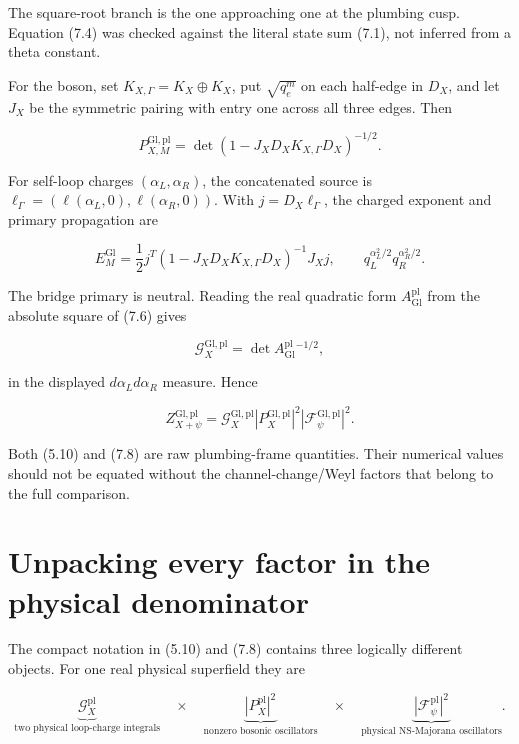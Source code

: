 \documentclass[11pt]{article}
\begin{document}
The square-root branch is the one approaching one at the plumbing cusp.
Equation (7.4) was checked against the literal state sum (7.1), not inferred
from a theta constant.

For the boson, set \(K_{X,\Gamma}=K_X\oplus K_X\), put
\(\sqrt{q_e^m}\) on each half-edge in \(D_X\), and let \(J_X\) be the
symmetric pairing with entry one across all three edges.  Then

\[
 P_{X,M}^{\mathrm{Gl},\mathrm{pl}}
 =\det\!\left(1-J_XD_XK_{X,\Gamma}D_X\right)^{-1/2}.
\tag{7.5}
\]

For self-loop charges \((\alpha_L,\alpha_R)\), the concatenated source is
\(\ell_\Gamma=(\ell(\alpha_L,0),\ell(\alpha_R,0))\).  With
\(j=D_X\ell_\Gamma\), the charged exponent and primary propagation are

\[
 E_M^{\mathrm{Gl}}
 =\frac12j^T
 \left(1-J_XD_XK_{X,\Gamma}D_X\right)^{-1}J_Xj,
 \qquad
 q_L^{\alpha_L^2/2}q_R^{\alpha_R^2/2}.
\tag{7.6}
\]

The bridge primary is neutral.  Reading the real quadratic form
\(A_{\mathrm{Gl}}^{\mathrm{pl}}\) from the absolute square of (7.6) gives

\[
 \mathcal G_X^{\mathrm{Gl},\mathrm{pl}}
 =\det A_{\mathrm{Gl}}^{\mathrm{pl}}{}^{-1/2},
\tag{7.7}
\]

in the displayed \(d\alpha_Ld\alpha_R\) measure.  Hence

\[
\boxed{
 Z_{X+\psi}^{\mathrm{Gl},\mathrm{pl}}
 =\mathcal G_X^{\mathrm{Gl},\mathrm{pl}}
  \left|P_X^{\mathrm{Gl},\mathrm{pl}}\right|^2
  \left|\mathcal F_\psi^{\mathrm{Gl},\mathrm{pl}}\right|^2.}
\tag{7.8}
\]

Both (5.10) and (7.8) are raw plumbing-frame quantities.  Their numerical
values should not be equated without the channel-change/Weyl factors that
belong to the full comparison.

\section{Unpacking every factor in the physical denominator}

The compact notation in (5.10) and (7.8) contains three logically different
objects.  For one real physical superfield they are

\[
 \underbrace{\mathcal G_X^{\mathrm{pl}}}_{
   \text{two physical loop-charge integrals}}
 \quad\times\quad
 \underbrace{|P_X^{\mathrm{pl}}|^2}_{
   \text{nonzero bosonic oscillators}}
 \quad\times\quad
 \underbrace{|\mathcal F_\psi^{\mathrm{pl}}|^2}_{
   \text{physical NS-Majorana oscillators}}.
\tag{8.1}
\]
\end{document}
